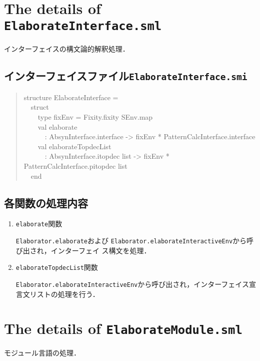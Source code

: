 \documentclass{jbook}
\newcommand{\txt}[2]{#2}
\newcommand{\code}[1]{\mbox{\large\tt #1}}
\newcommand{\myem}{\mbox{\ \ }}
\newenvironment{program}{\begin{quote}\begin{tt}}%
                        {\end{tt}\end{quote}}
\begin{document}
\section{\txt{\code{ElaborateInterface.sml}の処理の詳細}{The details of \code{ElaborateInterface.sml}}}
\ifjp%
	インターフェイスの構文論的解釈処理．

\subsection{インターフェイスファイル\code{ElaborateInterface.smi}}
\begin{program}
structure ElaborateInterface =\\
\myem   struct\\
\myem\myem     type fixEnv = Fixity.fixity SEnv.map\\
\myem\myem     val elaborate\\
\myem\myem\myem   : AbsynInterface.interface -> fixEnv * PatternCalcInterface.interface\\
\myem\myem     val elaborateTopdecList\\
\myem\myem\myem   : AbsynInterface.itopdec list -> fixEnv * PatternCalcInterface.pitopdec list\\
\myem  end
\end{program}

\subsection{各関数の処理内容}
\begin{enumerate}
\item \code{elaborate}関数

	\code{Elaborator.elaborate}および
\code{Elaborator.elaborateInteractiveEnv}から呼び出され，インターフェイ
ス構文を処理．

\item \code{elaborateTopdecList}関数

\code{Elaborator.elaborateInteractiveEnv}から呼び出され，インターフェイス宣言文リストの処理を行う．

\end{enumerate}
\else%
\fi%

\section{\txt{\code{ElaborateModule.sml}の処理の詳細}{The details of \code{ElaborateModule.sml}}}
\ifjp%
	モジュール言語の処理．
\end{document}
